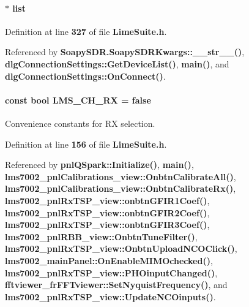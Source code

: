 \paragraph[{list}]{ $\ast$ list}\label{group__FN__HIGH__LVL_gab1fde1d41a8c00a4279c80226c9153e3}


Definition at line {\bf 327} of file {\bf Lime\+Suite.\+h}.



Referenced by {\bf Soapy\+S\+D\+R.\+Soapy\+S\+D\+R\+Kwargs\+::\+\_\+\+\_\+str\+\_\+\+\_\+()}, {\bf dlg\+Connection\+Settings\+::\+Get\+Device\+List()}, {\bf main()}, and {\bf dlg\+Connection\+Settings\+::\+On\+Connect()}.

\paragraph[{L\+M\+S\+\_\+\+C\+H\+\_\+\+RX}]{\setlength{\rightskip}{0pt plus 5cm}const bool L\+M\+S\+\_\+\+C\+H\+\_\+\+RX = false\hspace{0.3cm}{\ttfamily [static]}}\label{group__FN__HIGH__LVL_ga6315347ecc9dbff0d1ead974be3e8885}


Convenience constants for RX selection. 



Definition at line {\bf 156} of file {\bf Lime\+Suite.\+h}.



Referenced by {\bf pnl\+Q\+Spark\+::\+Initialize()}, {\bf main()}, {\bf lms7002\+\_\+pnl\+Calibrations\+\_\+view\+::\+Onbtn\+Calibrate\+All()}, {\bf lms7002\+\_\+pnl\+Calibrations\+\_\+view\+::\+Onbtn\+Calibrate\+Rx()}, {\bf lms7002\+\_\+pnl\+Rx\+T\+S\+P\+\_\+view\+::onbtn\+G\+F\+I\+R1\+Coef()}, {\bf lms7002\+\_\+pnl\+Rx\+T\+S\+P\+\_\+view\+::onbtn\+G\+F\+I\+R2\+Coef()}, {\bf lms7002\+\_\+pnl\+Rx\+T\+S\+P\+\_\+view\+::onbtn\+G\+F\+I\+R3\+Coef()}, {\bf lms7002\+\_\+pnl\+R\+B\+B\+\_\+view\+::\+Onbtn\+Tune\+Filter()}, {\bf lms7002\+\_\+pnl\+Rx\+T\+S\+P\+\_\+view\+::\+Onbtn\+Upload\+N\+C\+O\+Click()}, {\bf lms7002\+\_\+main\+Panel\+::\+On\+Enable\+M\+I\+M\+Ochecked()}, {\bf lms7002\+\_\+pnl\+Rx\+T\+S\+P\+\_\+view\+::\+P\+H\+Oinput\+Changed()}, {\bf fftviewer\+\_\+fr\+F\+F\+Tviewer\+::\+Set\+Nyquist\+Frequency()}, and {\bf lms7002\+\_\+pnl\+Rx\+T\+S\+P\+\_\+view\+::\+Update\+N\+C\+Oinputs()}.

